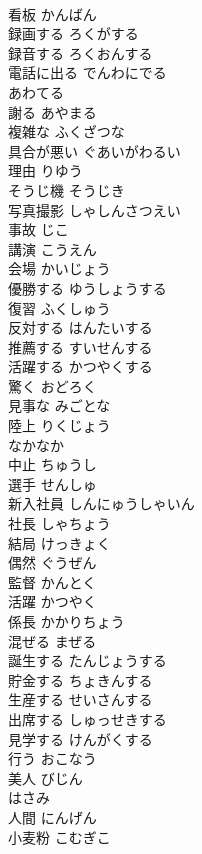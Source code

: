 \documentclass[8pt]{extreport}
\begin{document}
\begin{CJK}{UTF8}{min}
\\	看板	かんばん	
\\	録画する	ろくがする	
\\	録音する	ろくおんする	
\\	電話に出る	でんわにでる	
\\	あわてる		
\\	謝る	あやまる	
\\	複雑な	ふくざつな	
\\	具合が悪い	ぐあいがわるい	
\\	理由	りゆう	
\\	そうじ機	そうじき	
\\	写真撮影	しゃしんさつえい	
\\	事故	じこ	
\\	講演	こうえん	
\\	会場	かいじょう	
\\	優勝する	ゆうしょうする	
\\	復習	ふくしゅう	
\\	反対する	はんたいする	
\\	推薦する	すいせんする	
\\	活躍する	かつやくする	
\\	驚く	おどろく	
\\	見事な	みごとな	
\\	陸上	りくじょう	
\\	なかなか		
\\	中止	ちゅうし	
\\	選手	せんしゅ	
\\	新入社員	しんにゅうしゃいん	
\\	社長	しゃちょう	
\\	結局	けっきょく	
\\	偶然	ぐうぜん	
\\	監督	かんとく	
\\	活躍	かつやく	
\\	係長	かかりちょう	
\\	混ぜる	まぜる	
\\	誕生する	たんじょうする	
\\	貯金する	ちょきんする	
\\	生産する	せいさんする	
\\	出席する	しゅっせきする	
\\	見学する	けんがくする	
\\	行う	おこなう	
\\	美人	びじん	
\\	はさみ		
\\	人間	にんげん	
\\	小麦粉	こむぎこ	

\end{CJK}
\end{document}
